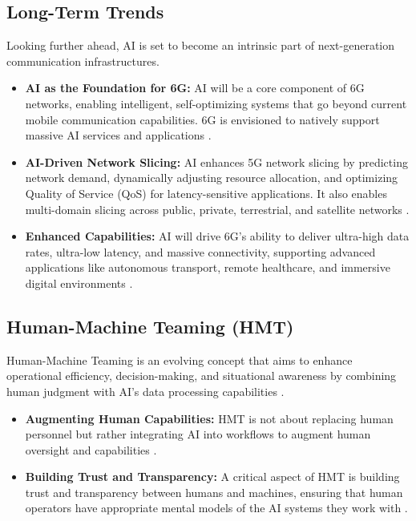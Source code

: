 \subsection{Long-Term Trends}
Looking further ahead, AI is set to become an intrinsic part of next-generation communication infrastructures.
\begin{itemize}
    \item \textbf{AI as the Foundation for 6G:} AI will be a core component of 6G networks, enabling intelligent, self-optimizing systems that go beyond current mobile communication capabilities. 6G is envisioned to natively support massive AI services and applications \cite{Huawei_FutureTrends, 6GAmericas_FutureTrends}.
    \item \textbf{AI-Driven Network Slicing:} AI enhances 5G network slicing by predicting network demand, dynamically adjusting resource allocation, and optimizing Quality of Service (QoS) for latency-sensitive applications. It also enables multi-domain slicing across public, private, terrestrial, and satellite networks \cite{UWaterloo_FutureTrends, Byanat_FutureTrends}.
    \item \textbf{Enhanced Capabilities:} AI will drive 6G's ability to deliver ultra-high data rates, ultra-low latency, and massive connectivity, supporting advanced applications like autonomous transport, remote healthcare, and immersive digital environments \cite{Qualcomm_FutureTrends, SiliconRepublic_FutureTrends}.
\end{itemize}

\subsection{Human-Machine Teaming (HMT)}
Human-Machine Teaming is an evolving concept that aims to enhance operational efficiency, decision-making, and situational awareness by combining human judgment with AI's data processing capabilities \cite{Mischadohler_HMT_1}.
\begin{itemize}
    \item \textbf{Augmenting Human Capabilities:} HMT is not about replacing human personnel but rather integrating AI into workflows to augment human oversight and capabilities \cite{Mischadohler_HMT_2}.
    \item \textbf{Building Trust and Transparency:} A critical aspect of HMT is building trust and transparency between humans and machines, ensuring that human operators have appropriate mental models of the AI systems they work with \cite{Mischadohler_HMT_1}.
\end{itemize}

